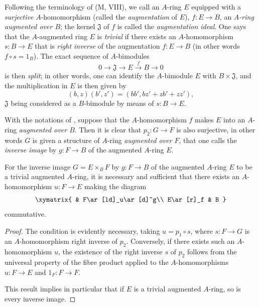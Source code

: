\begin{env}[18.1.4]
\label{0.18.1.4}
Following the terminology of (M, VIII), we call an $A$-ring $E$ equipped with a \emph{surjective} $A$-homomorphism (called the \emph{augmentation} of $E$), $f:E\to B$, an \emph{$A$-ring augmented over $B$}; the kernel $\mathfrak{J}$ of $f$ is called the \emph{augmentation ideal}.
One says that the $A$-augmented ring $E$ is \emph{trivial} if there exists an $A$-homomorphism $s:B\to E$ that is \emph{right inverse} of the augmentation $f:E\to B$ (in other words $f\circ s=1_B$).
The exact sequence of $A$-bimodules
\[
  0\to\mathfrak{J}\to E\xrightarrow{f} B\to 0
\]
is then \emph{split}; in other words, one can identify the $A$-bimodule $E$ with $B\times\mathfrak{J}$, and the multiplication in $E$ is then given by
\[
  (b,z)(b',z')=(bb',bz'+zb'+zz'),
\]
$\mathfrak{J}$ being considered as a $B$-bimodule by means of $s:B\to E$.
\end{env}

\begin{env}[18.1.5]
\label{0.18.1.5}
With the notations of , suppose that the $A$-homomorphism $f$ makes $E$ into an $A$-ring \emph{augmented over $B$}.
Then it is clear that $p_2:G\to F$ is also surjective, in other words $G$ is given a structure of $A$-ring \emph{augmented over $F$}, that one calls the \emph{inverse image} by $g:F\to B$ of the augmented $A$-ring $E$.
\end{env}

\begin{proposition}[18.1.6]
\label{0.18.1.6}
For the inverse image $G=E\times_B F$ by $g:F\to B$ of the augmented $A$-ring $E$ to be a trivial augmented $A$-ring, it is necessary and sufficient that there exists an $A$-homomorphism $u:F\to E$ making the diagram
\[
  \xymatrix{
    & F\ar[ld]_u\ar[d]^g\\
    E\ar[r]_f & B
  }
\]
commutative.
\end{proposition}

\begin{proof}
The condition is evidently necessary, taking $u=p_1\circ s$, where $s:F\to G$ is an $A$-homomorphism right inverse of $p_2$.
Conversely, if there exists such an $A$-homomorphism $u$, the existence of the right inverse $s$ of $p_2$ follows from the universal property of the fibre product  applied to the $A$-homomorphisms $u:F\to E$ and $1_F:F\to F$.

This result implies in particular that if $E$ is a trivial augmented $A$-ring, so is every inverse image.
\end{proof}

